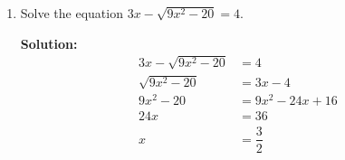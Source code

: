 \documentclass{report}
\newcommand{\sol}{\vspace{0.2cm}\textbf{Solution:}\vspace{0.2cm}}
\begin{document}
\begin{multicols*}{2}
\begin{enumerate}[leftmargin=*]
\begin{enumerate}
                        \sol{}
                        \begin{align*}
                            \dfrac{5^{3x}}{25^y} & = 3125           \\
                            5^{3x}               & = 5^{5 + 2y}     \\
                            3x                   & = 5 + 2y         \\
                            3x - 2y              & = 5\ \cdots\ (1)
                        \end{align*}
                        \begin{align*}
                            2^x 4^{(y-1)}  & = 32             \\
                            2^x 2^{2(y-1)} & = 2^5            \\
                            2^{x+2y-2}     & = 2^5            \\
                            x + 2y - 2     & = 5              \\
                            x + 2y         & = 7\ \cdots\ (2)
                        \end{align*}
                        Adding $(1)$ and $(2)$,
                        \begin{align*}
                            4x & = 12 \\
                            x  & = 3
                        \end{align*}
                        Substituting $x=3$ into $(1)$,
                        \begin{align*}
                            9 - 2y & = 5 \\
                            y      & = 2
                        \end{align*}

                  \item Solve the equation $3 x-\sqrt{9 x^2-20}=4$.

                        \sol{}
                        \begin{align*}
                            3x - \sqrt{9x^2 - 20} & = 4               \\
                            \sqrt{9x^2 - 20}      & = 3x - 4          \\
                            9x^2 - 20             & = 9x^2 - 24x + 16 \\
                            24x                   & = 36              \\
                            x                     & = \dfrac{3}{2}
                        \end{align*}
              \end{enumerate}


\end{enumerate}
\end{multicols*}
\end{document}
